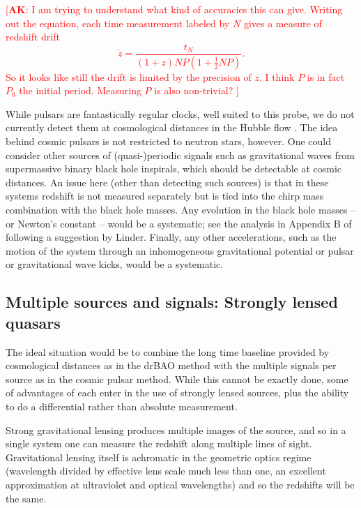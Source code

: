 \documentclass[preprint2, 10pt]{aastex}
\newcommand{\alex}[1]{\textcolor{red}{[{\bf AK}: #1]}}
\begin{document}
\alex{I am trying to understand what kind of accuracies this can give.
Writing out the equation, each time measurement labeled by $N$ gives a measure of redshift drift
\begin{equation}
\dot{z}=\frac{t_N}{(1+z)NP(1+\frac{1}{2}NP)}.
\end{equation}
So it looks like still the drift is limited by the precision of $z$.  I think $P$ is in
fact $P_0$ the initial period.  Measuring $P$ is also non-trivial?
}

While pulsars are fantastically regular clocks, well suited to this probe, 
we do not currently detect them at cosmological distances in the Hubble 
flow \citep[but see][]{13071628}.  The idea behind cosmic pulsars is not 
restricted to neutron stars, however.  
One could consider other sources of (quasi-)periodic signals such as 
gravitational waves from supermassive binary black hole inspirals, which 
should be detectable 
at cosmic distances.  An issue here (other than detecting such sources) 
is that in these systems redshift is not measured separately but is tied 
into the chirp mass combination with the black hole masses.  Any evolution 
in the black hole masses -- or Newton's constant -- would be a systematic; 
see the analysis in Appendix B of \citet{09122724} following a suggestion 
by Linder.  Finally, any other accelerations, such as the motion of the system 
through an inhomogeneous gravitational potential or pulsar or gravitational 
wave kicks, would be a systematic. 


\subsection{Multiple sources and signals: Strongly lensed quasars} \label{sec:lens} 

The ideal situation would be to combine the long time baseline provided 
by cosmological distances as in the drBAO method with the multiple 
signals per source as in the cosmic pulsar method.  While this cannot be 
exactly done, some of advantages of each enter in the use of strongly 
lensed sources, plus the ability to do a differential rather than absolute 
measurement. 

Strong gravitational lensing produces multiple images of the source, 
and so in a single system one can measure the redshift along multiple 
lines of sight.  Gravitational lensing itself is achromatic in the 
geometric optics regime (wavelength divided by effective lens scale 
much less than one, an excellent approximation at ultraviolet and optical 
wavelengths) 
and so the redshifts will be the same. 
\end{document}
